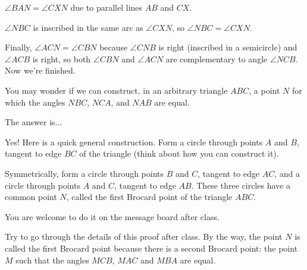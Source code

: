 $\angle BAN = \angle CXN$ due to parallel lines $AB$ and $CX.$

$\angle NBC$ is inscribed in the same arc as $\angle CXN$, so $\angle NBC = \angle CXN$.

Finally, $\angle ACN = \angle CBN$ because $\angle CNB$ is right (inscribed in a semicircle) and $\angle ACB$ is right, so both $\angle CBN$ and $\angle ACN$ are complementary to angle $\angle NCB$. Now we're finished.

You may wonder if we can construct, in an arbitrary triangle $ABC$, a point $N$ for which the angles $NBC$, $NCA$, and $NAB$ are equal.

The answer is...





Yes! Here is a quick general construction. Form a circle through points $A$ and $B$, tangent to edge $BC$ of the triangle (think about how you can construct it).

Symmetrically, form a circle through points $B$ and $C$, tangent to edge $AC$, and a circle through points $A$ and $C$, tangent to edge $AB$. These three circles have a common point $N$, called the first Brocard point of the triangle $ABC$.


You are welcome to do it on the message board after class. 


 Try to go through the details of this proof after class. By the way, the point $N$ is called the first Brocard point because there is a second Brocard point: the point $M$ such that the angles $MCB$, $MAC$ and $MBA$ are equal.

